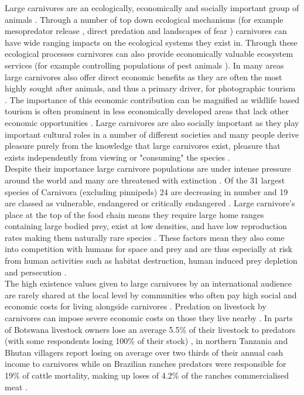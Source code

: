 Large carnivores are an ecologically, economically and socially important group of animals \citep{Wolf2016,Ripple2014a}. Through a number of top down ecological mechanisms (for example mesopredator release \citep{brashares2010ecological,Crooks1999a,Ripple2013}, direct predation and landscapes of fear \citep{Ripple2004,Schmitz1997}) carnivores can have wide ranging impacts on the ecological systems they exist in. Through these ecological processes carnivores can also provide economically valuable ecosystem services (for example controlling populations of pest animals \citep{brashares2010ecological,Prowse2014,Packer2005}). In many areas large carnivores also offer direct economic benefits as they are often the most highly sought after animals, and thus a primary driver, for photographic tourism \citep{Lindsey2007a,Maciejewski2014}. The importance of this economic contribution can be magnified as wildlife based tourism is often prominent in less economically developed areas that lack other economic opportunities \citep{Ashley2000}. Large carnivores are also socially important as they play important cultural roles in a number of different societies \citep{Hazzah2009a,Shen1982,coggins2003tiger,Kellert1996} and many people derive pleasure purely from the knowledge that large carnivores exist, pleasure that exists independently from viewing or "consuming" the species \citep{Stevens2016}.\\

Despite their importance large carnivore populations are under intense pressure around the world and many are threatened with extinction \citep{ray2013large,Wolf2016,Ripple2014a}. Of the 31 largest species of Carnivora (excluding pinnipeds) 24 are decreasing in number and 19 are classed as vulnerable, endangered or critically endangered \citep{Ripple2014a}. Large carnivore's place at the top of the food chain means they require large home ranges containing large bodied prey, exist at low densities, and have low reproduction rates making them naturally rare species \citep{Ripple2014a}. These factors mean they also come into competition with humans for space and prey and are thus especially at risk from human activities such as habitat destruction, human induced prey depletion and persecution \citep{Woodroffe1998}.\\

The high existence values given to large carnivores by an international audience are rarely shared at the local level by communities who often pay high social and economic costs for living alongside carnivores \citep{Dickman2011,Abade2014h}. Predation on livestock by carnivores can impose severe economic costs on those they live nearby \citep{loveridge2010people}. In parts of Botswana livestock owners lose an average 5.5\% of their livestock to predators (with some respondents losing 100\% of their stock) \citep{Hemson2009b}, in northern Tanzania and Bhutan villagers report losing on average over two thirds of their annual cash income to carnivores \citep{Holmern2007a,Wang2006a} while on Brazilian ranches predators were responsible for 19\% of cattle mortality, making up loses of 4.2\% of the ranches commercialised meat \citep{Palmeira2008}.\\

